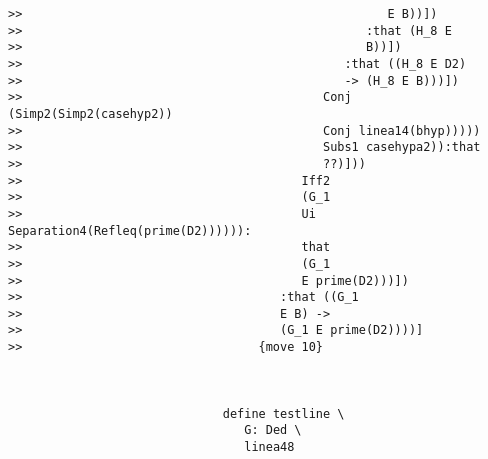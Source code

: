 \documentclass[12pt]{article}
\begin{document}
\begin{verbatim}
>>                                                   E B))])
>>                                                :that (H_8 E
>>                                                B))])
>>                                             :that ((H_8 E D2)
>>                                             -> (H_8 E B)))])
>>                                          Conj (Simp2(Simp2(casehyp2))
>>                                          Conj linea14(bhyp)))))
>>                                          Subs1 casehypa2)):that
>>                                          ??)]))
>>                                       Iff2
>>                                       (G_1
>>                                       Ui Separation4(Refleq(prime(D2)))))):
>>                                       that
>>                                       (G_1
>>                                       E prime(D2)))])
>>                                    :that ((G_1
>>                                    E B) ->
>>                                    (G_1 E prime(D2))))]
>>                                 {move 10}



                              define testline \
                                 G: Ded \
                                 linea48


\end{verbatim}
\end{document}

